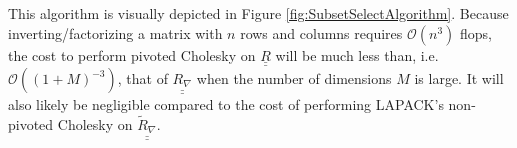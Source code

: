 This algorithm is visually depicted in Figure 
\ref{fig:SubsetSelectAlgorithm}.  Because inverting/factorizing a matrix 
with $n$ rows and columns requires $\mathcal{O}\left(n^3\right)$ flops, 
the cost to perform pivoted Cholesky on $\underline{\underline{R}}$ will be 
much less than, i.e. $\mathcal{O}\left((1+M)^{-3}\right)$, that of 
$\underline{\underline{R_{\nabla}}}$ when the number of dimensions $M$ 
is large.  It will also likely be negligible compared to the cost of
performing LAPACK's non-pivoted Cholesky on 
$\underline{\underline{\tilde{R}_{\nabla}}}$.